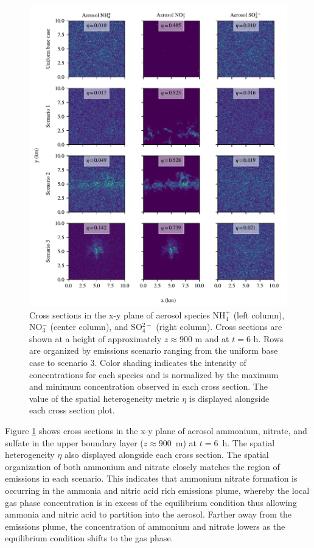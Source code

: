 \documentclass[journal abbreviation, manuscript]{copernicus}
\begin{document}
\begin{figure}[!h]
	\centering
	\includegraphics[]{figures/aerosol-SNA-spatial-heterogeneity-time36-z45.pdf}
	\caption{Cross sections in the x-y plane of aerosol species NH$_4^+$ (left column), NO$_3^-$ (center column), and SO$_4^{2-}$ (right column). Cross sections are shown at a height of approximately $z\approx900$ m and at $t=6$ h. Rows are organized by emissions scenario ranging from the uniform base case to scenario 3. Color shading indicates the intensity of concentrations for each species and is normalized by the maximum and minimum concentration observed in each cross section. The value of the spatial heterogeneity metric $\eta$ is displayed alongside each cross section plot.}
	\label{fig:aero-cross-sec}
\end{figure} 

Figure \ref{fig:aero-cross-sec} shows cross sections in the x-y plane of aerosol ammonium, nitrate, and sulfate in the upper boundary layer ($z\approx900$~m) at $t=6$~h. The spatial heterogeneity $\eta$ also displayed alongside each cross section. The spatial organization of both ammonium and nitrate closely matches the region of emissions in each scenario. This indicates that ammonium nitrate formation is occurring in the ammonia and nitric acid rich emissions plume, whereby the local gas phase concentration is in excess of the equilibrium condition thus allowing ammonia and nitric acid to partition into the aerosol. Farther away from the emissions plume, the concentration of ammonium and nitrate lowers as the equilibrium condition shifts to the gas phase. 
\end{document}
